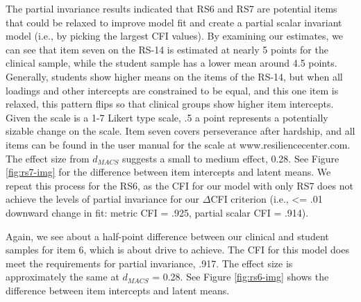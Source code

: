 \documentclass[
  man]{apa7}
\begin{document}
The partial invariance results indicated that RS6 and RS7 are potential items that could be relaxed to improve model fit and create a partial scalar invariant model (i.e., by picking the largest CFI values). By examining our estimates, we can see that item seven on the RS-14 is estimated at nearly 5 points for the clinical sample, while the student sample has a lower mean around 4.5 points. Generally, students show higher means on the items of the RS-14, but when all loadings and other intercepts are constrained to be equal, and this one item is relaxed, this pattern flips so that clinical groups show higher item intercepts. Given the scale is a 1-7 Likert type scale, .5 a point represents a potentially sizable change on the scale. Item seven covers perseverance after hardship, and all items can be found in the user manual for the scale at www.resiliencecenter.com. The effect size from \(d_{MACS}\) suggests a small to medium effect, 0.28. See Figure \ref{fig:rs7-img} for the difference between item intercepts and latent means. We repeat this process for the RS6, as the CFI for our model with only RS7 does not achieve the levels of partial invariance for our \(\Delta\)CFI criterion (i.e., \textless= .01 downward change in fit: metric CFI = .925, partial scalar CFI = .914).

Again, we see about a half-point difference between our clinical and student samples for item 6, which is about drive to achieve. The CFI for this model does meet the requirements for partial invariance, .917. The effect size is approximately the same at \(d_{MACS}\) = 0.28. See Figure \ref{fig:rs6-img} shows the difference between item intercepts and latent means.
\end{document}
